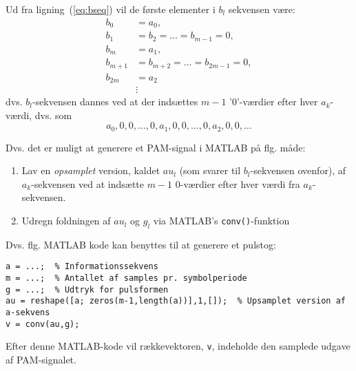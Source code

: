 \documentclass[dvips,11pt,a4paper]{article}
\begin{document}
Ud fra ligning~(\ref{eq:bseq}) vil de første elementer i $b_l$ sekvensen være:
\begin{align*}
b_{0}&=a_{0},\\
b_{1}&=b_{2}=\ldots{}=b_{m-1}=0,\\
b_{m}&=a_{1},\\
b_{m+1}&=b_{m+2}=\ldots{}=b_{2m-1}=0,\\
b_{2m}&=a_{2}\\
&\vdots
\end{align*}
dvs. $b_l$-sekvensen dannes ved at der indsættes $m-1$ '0'-værdier efter hver $a_k$-værdi, dvs. som
\[
a_0,0,0,\ldots,0,a_1,0,0,\ldots,0,a_2,0,0,\ldots
\]

\noindent{}Dvs. det er muligt at generere et PAM-signal i MATLAB på flg. måde:
\begin{enumerate}
\item Lav en \emph{opsamplet} version, kaldet $au_l$ (som svarer til $b_l$-sekvensen ovenfor), af $a_k$-sekvensen ved at indsætte $m-1$ 0-værdier efter hver værdi fra $a_k$-sekvensen.
\item Udregn foldningen af $au_l$ og $g_l$ via MATLAB's \texttt{conv()}-funktion
\end{enumerate}

\noindent{}Dvs. flg. MATLAB kode kan benyttes til at generere et pulstog:
\begin{verbatim}
a = ...;  % Informationssekvens
m = ...;  % Antallet af samples pr. symbolperiode
g = ...;  % Udtryk for pulsformen
au = reshape([a; zeros(m-1,length(a))],1,[]);  % Upsamplet version af a-sekvens
v = conv(au,g);
\end{verbatim}

\noindent{}Efter denne MATLAB-kode vil rækkevektoren, \texttt{v}, indeholde den samplede udgave af PAM-signalet.
\end{document}
